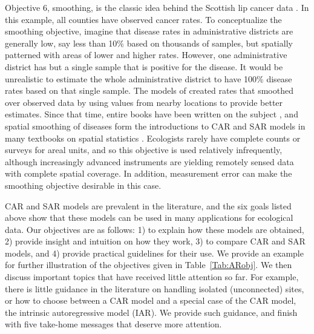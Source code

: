 \documentclass[11pt, titlepage]{article}\usepackage[]{graphicx}\usepackage[]{color}
\begin{document}
\begin{spacing}{1.9}
\begin{flushleft}
Objective 6, smoothing, is the classic idea behind the Scottish lip cancer data \citep{Clay:Kald:empi:1987}.  In this example, all counties have observed cancer rates. To conceptualize the smoothing objective, imagine that disease rates in administrative districts are generally low, say less than 10\% based on thousands of samples, but spatially patterned with areas of lower and higher rates.  However, one administrative district has but a single sample that is positive for the disease.  It would be unrealistic to estimate the whole administrative district to have 100\% disease rates based on that single sample.  The models of \citet{Clay:Kald:empi:1987} created rates that smoothed over observed data by using values from nearby locations to provide better estimates.  Since that time, entire books have been written on the subject \citep[e.g.,][]{Elli:Wake:Best:Brig:2000,Pfei:Robi:Stev:Stev:Roge:spat:2008,Laws:stat:2013}, and spatial smoothing of diseases form the introductions to CAR and SAR models in many textbooks on spatial statistics \citep{Cres:stat:1993,Wall:Gotw:appl:2004, Scha:Gotw:stat:2005, Bane:Carl:Gelf:hier:2014}.  Ecologists rarely have complete counts or surveys for areal units, and so this objective is used relatively infrequently, although increasingly advanced instruments \citep[e.g., LIDAR, ][]{Camp:Wynn:intr:2011} are yielding remotely sensed data with complete spatial coverage.  In addition, measurement error can make the smoothing objective desirable in this case.

CAR and SAR models are prevalent in the literature, and the six goals listed above show that these models can be used in many applications for ecological data.  Our objectives are as follows: 1) to explain how these models are obtained, 2) provide insight and intuition on how they work, 3) to compare CAR and SAR models, and 4) provide practical guidelines for their use. We provide an example for further illustration of the objectives given in Table~\ref{Tab:ARobj}. We then discuss important topics that have received little attention so far.  For example, there is little guidance in the literature on handling isolated (unconnected) sites, or how to choose between a CAR model and a special case of the CAR model, the intrinsic autoregressive model (IAR).  We provide such guidance, and finish with five take-home messages that deserve more attention.
 



\end{flushleft}
\end{spacing}
\end{document}
